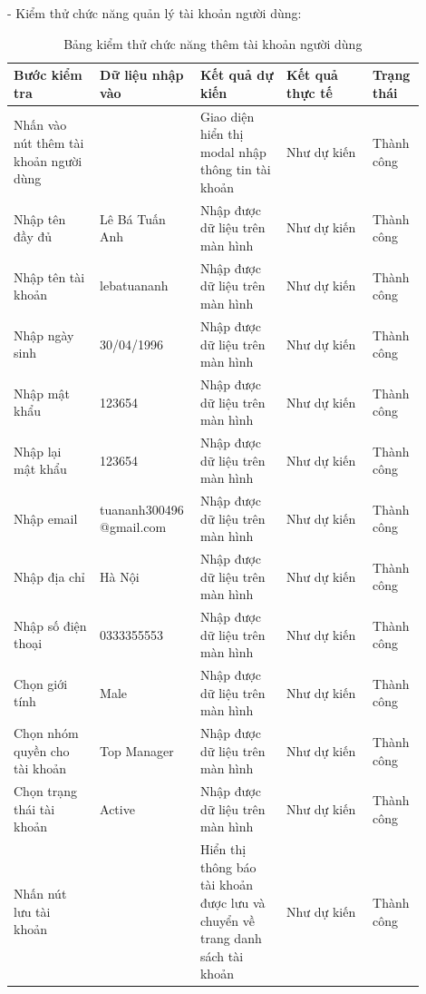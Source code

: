 - Kiểm thử chức năng quản lý tài khoản người dùng:
\begin{longtable}[htp]{ |m{0.2\linewidth}|m{0.2\linewidth}|m{0.2\linewidth}|m{0.2\linewidth}|m{0.1\linewidth}|}
 \caption{Bảng kiểm thử chức năng thêm tài khoản người dùng \label{updateProduct}}\\
 \hline
 Bước kiểm tra & Dữ liệu nhập vào & Kết quả dự kiến & Kết quả thực tế & Trạng thái \\
 \hline
  Nhấn vào nút thêm tài khoản người dùng & & Giao diện hiển thị modal nhập thông tin tài khoản & Như dự kiến & Thành công\\
 \hline
   Nhập tên đầy đủ & Lê Bá Tuấn Anh & Nhập được dữ liệu trên màn hình & Như dự kiến & Thành công\\
 \hline
   Nhập tên tài khoản & lebatuananh & Nhập được dữ liệu trên màn hình & Như dự kiến & Thành công\\
 \hline
   Nhập ngày sinh & 30/04/1996 & Nhập được dữ liệu trên màn hình & Như dự kiến & Thành công\\
 \hline
   Nhập mật khẩu & 123654 & Nhập được dữ liệu trên màn hình & Như dự kiến & Thành công\\
 \hline
   Nhập lại mật khẩu & 123654 & Nhập được dữ liệu trên màn hình & Như dự kiến & Thành công\\
 \hline
   Nhập email & tuananh300496 @gmail.com & Nhập được dữ liệu trên màn hình & Như dự kiến & Thành công\\
 \hline
   Nhập địa chỉ & Hà Nội & Nhập được dữ liệu trên màn hình & Như dự kiến & Thành công\\
 \hline
   Nhập số điện thoại & 0333355553 & Nhập được dữ liệu trên màn hình & Như dự kiến & Thành công\\
 \hline
   Chọn giới tính & Male & Nhập được dữ liệu trên màn hình & Như dự kiến & Thành công\\
 \hline
   Chọn nhóm quyền cho tài khoản & Top Manager & Nhập được dữ liệu trên màn hình & Như dự kiến & Thành công\\
 \hline
    Chọn trạng thái tài khoản & Active & Nhập được dữ liệu trên màn hình & Như dự kiến & Thành công\\
 \hline
    Nhấn nút lưu tài khoản && Hiển thị thông báo tài khoản được lưu và chuyển về trang danh sách tài khoản  & Như dự kiến & Thành công\\
 \hline
\end{longtable}

